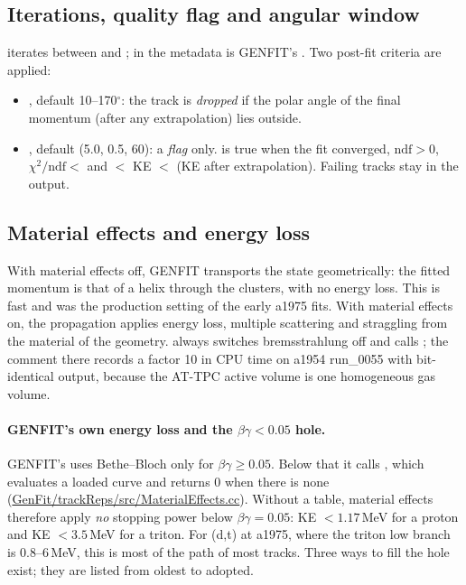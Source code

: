 \subsection{Iterations, quality flag and angular window}

 iterates between  and ;  in the metadata
is GENFIT's . Two post-fit criteria are applied:
\begin{itemize}
\item {}, default 10--170$^\circ$: the track is \emph{dropped} if the polar angle of
  the final momentum (after any extrapolation) lies outside.
\item {}, default (5.0, 0.5, 60): a \emph{flag} only.
   is true when the fit converged, $\mathrm{ndf}>0$, $\chi^2/\mathrm{ndf}<$  and
   $<$ KE $<$  (KE after extrapolation). Failing tracks stay in the output.
\end{itemize}

\subsection{Material effects and energy loss}
\label{sec:gf-eloss}

With material effects off, GENFIT transports the state geometrically: the fitted momentum is that of a helix through
the clusters, with no energy loss. This is fast and was the production setting of the early a1975 fits. With
material effects on, the propagation applies energy loss, multiple scattering and straggling from the material of the
geometry.  always switches bremsstrahlung off and calls
; the comment there records a factor 10 in CPU time on a1954
run\_0055 with bit-identical output, because the AT-TPC active volume is one homogeneous gas volume.

\paragraph{GENFIT's own energy loss and the $\beta\gamma<0.05$ hole.} GENFIT's  uses
Bethe--Bloch only for $\beta\gamma\ge 0.05$. Below that it calls , which evaluates a loaded \dedx{}
curve and returns 0 when there is none (\url{GenFit/trackReps/src/MaterialEffects.cc}). Without a table, material
effects therefore apply \emph{no} stopping power below $\beta\gamma = 0.05$: KE $<1.17$\,MeV for a proton and
KE $<3.5$\,MeV for a triton. For (d,t) at a1975, where the triton low branch is 0.8--6\,MeV, this is most of the path
of most tracks. Three ways to fill the hole exist; they are listed from oldest to adopted.

